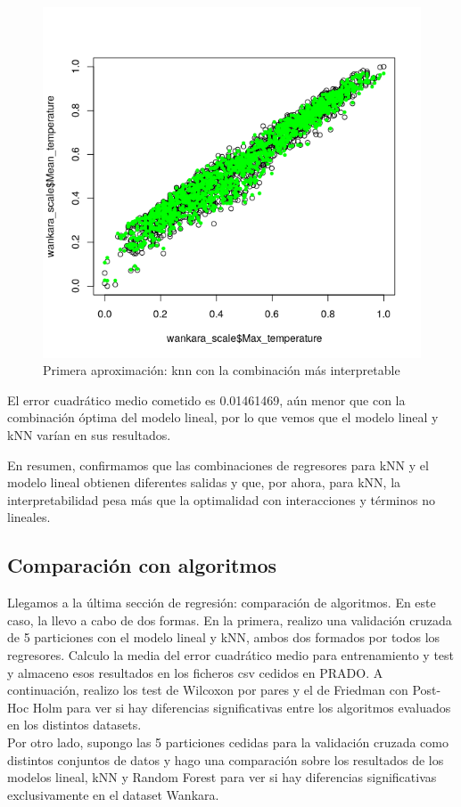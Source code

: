 \begin{itemize}
	\begin{figure}[H] %
		\centering
		\includegraphics[scale=0.5]{knn3.png}  %
		\caption{Primera aproximación: knn con la combinación más interpretable} 
		\label{fig:knn3}
	\end{figure}
	
	El error cuadrático medio cometido es 0.01461469, aún menor que con la combinación óptima del modelo lineal, por lo que vemos que el modelo lineal y kNN varían en sus resultados. 
\end{itemize} 

	En resumen, confirmamos que las combinaciones de regresores para kNN y el modelo lineal obtienen diferentes salidas y que, por ahora, para kNN, la interpretabilidad pesa más que la optimalidad con interacciones y términos no lineales.

\subsection{Comparación con algoritmos}

Llegamos a la última sección de regresión: comparación de algoritmos. En este caso, la llevo a cabo de dos formas. En la primera, realizo una validación cruzada de 5 particiones con el modelo lineal y kNN, ambos dos formados por todos los regresores. Calculo la media del error cuadrático medio para entrenamiento y test y almaceno esos resultados en los ficheros csv cedidos en PRADO. A continuación, realizo los test de Wilcoxon por pares y el de Friedman con Post-Hoc Holm para ver si hay diferencias significativas entre los algoritmos evaluados en los distintos datasets. \\
Por otro lado, supongo las 5 particiones cedidas para la validación cruzada como distintos conjuntos de datos y hago una comparación sobre los resultados de los modelos lineal, kNN y Random Forest para ver si hay diferencias significativas exclusivamente en el dataset Wankara.

